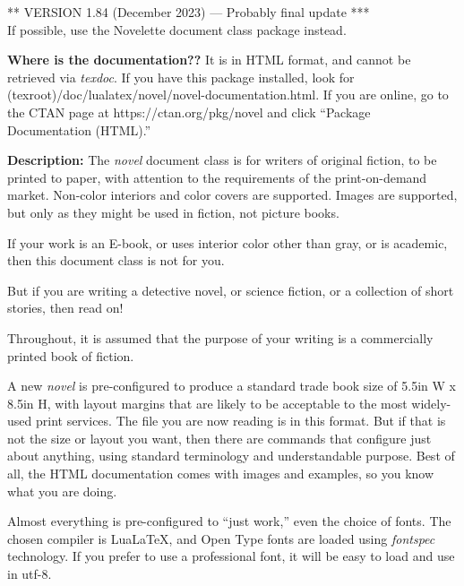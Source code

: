 \documentclass{novel} %
\begin{document}
\begin{ChapterStart}[8]
\vspace{\nbs} %
\vspace{\nbs}
{\centering*** VERSION 1.84 (December 2023) --- Probably final update ***\\
If possible, use the Novelette document class package instead.\par}
\end{ChapterStart}

\textbf{Where is the documentation??} It is in HTML format, and cannot be retrieved via  \textit{texdoc}. If you have this package installed, look for (texroot)/doc/lualatex/novel/novel-documentation.html. If you are online, go to the CTAN page at https://ctan.org/pkg/novel and click ``Package Documentation (HTML).''

\scenebreak

\textbf{Description:} The \emph{novel} document class is for writers of original fiction, to be printed to paper, with attention to the requirements of the print-on-demand market. Non-color interiors and color covers are supported. Images are supported, but only as they might be used in fiction, not picture books.

If your work is an E-book, or uses interior color other than gray, or is academic, then this document class is not for you. 

But if you are writing a detective novel, or science fiction, or a collection of short stories, then read on!


Throughout, it is assumed that the purpose of your writing is a commercially printed book of fiction.

A new \emph{novel} is pre-configured to produce a standard trade book size of 5.5in W x 8.5in H, with layout margins that are likely to be acceptable to the most widely-used print services. The file you are now reading is in this format. But if that is not the size or layout you want, then there are commands that configure just about anything, using standard terminology and understandable purpose. Best of all, the HTML documentation comes with images and examples, so you know what you are doing.

Almost everything is pre-configured to “just work,” even the choice of fonts. The chosen compiler is LuaLaTeX, and Open Type fonts are loaded using \textit{fontspec} technology. If you prefer to use a professional font, it will be easy to load and use in utf-8.
\end{document}
